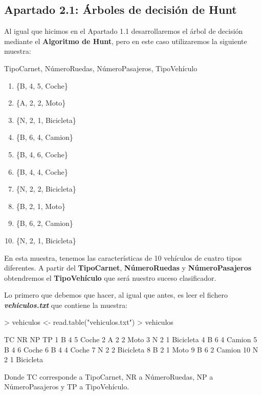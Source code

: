 \documentclass [a4paper] {article}
\begin{document}
\subsection{Apartado 2.1: Árboles de decisión de Hunt}
Al igual que hicimos en el Apartado 1.1 desarrollaremos el árbol de decisión mediante el \textbf{Algoritmo de Hunt}, pero en este caso utilizaremos la
siguiente muestra:
\begin{center}
  {TipoCarnet, NúmeroRuedas, NúmeroPasajeros, TipoVehículo}
  \begin{enumerate}
    \centering
    \item \{B, 4, 5, Coche\}
    \item \{A, 2, 2, Moto\}
    \item \{N, 2, 1, Bicicleta\}
    \item \{B, 6, 4, Camion\}
    \item \{B, 4, 6, Coche\}
    \item \{B, 4, 4, Coche\}
    \item \{N, 2, 2, Bicicleta\}
    \item \{B, 2, 1, Moto\}
    \item \{B, 6, 2, Camion\}
	\item \{N, 2, 1, Bicicleta\}
  \end{enumerate}
\end{center}
En esta muestra, tenemos las características de 10 vehículos de cuatro tipos diferentes. A partir del \textbf{TipoCarnet}, \textbf{NúmeroRuedas} y
\textbf{NúmeroPasajeros} obtendremos el \textbf{TipoVehículo} que será nuestro suceso clasificador.

Lo primero que debemos que hacer, al igual que antes, es leer el fichero \textbf{\textit{vehiculos.txt}} que contiene la muestra:
\begin{Schunk}
\begin{Sinput}
> vehiculos <- read.table("vehiculos.txt")
> vehiculos
\end{Sinput}
\begin{Soutput}
   TC NR NP        TP
1   B  4  5     Coche
2   A  2  2      Moto
3   N  2  1 Bicicleta
4   B  6  4    Camion
5   B  4  6     Coche
6   B  4  4     Coche
7   N  2  2 Bicicleta
8   B  2  1      Moto
9   B  6  2    Camion
10  N  2  1 Bicicleta
\end{Soutput}
\end{Schunk}

Donde TC corresponde a TipoCarnet, NR a NúmeroRuedas, NP a NúmeroPasajeros y TP a TipoVehículo.
\end{document}

